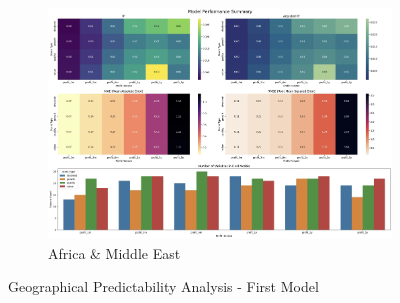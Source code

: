 \documentclass[11pt,english,a4paper,hidelinks]{book}
\begin{document}
\begin{figure}[H]
    \vspace{0.5cm}
    \begin{subfigure}[b]{0.48\textwidth}
        \centering
        \includegraphics[width=\textwidth]{images/code/models/linear_regression/first_model/AF - performance.png}
        \caption{Africa \& Middle East}
    \end{subfigure}
    \caption{Geographical Predictability Analysis - First Model}
    \label{fig:region_performance_first_model}
\end{figure}
\end{document}

